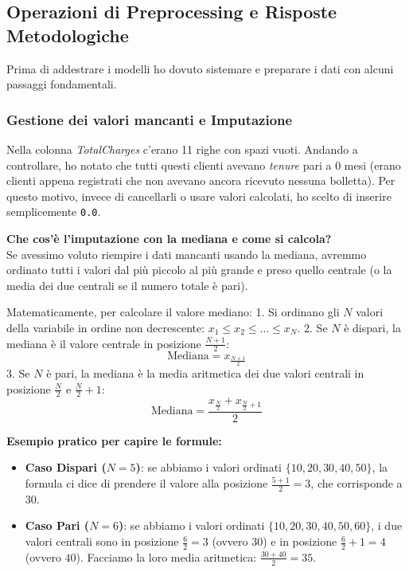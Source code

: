 \documentclass[a4paper,11pt]{article}
\begin{document}
\subsection{Operazioni di Preprocessing e Risposte Metodologiche}
Prima di addestrare i modelli ho dovuto sistemare e preparare i dati con alcuni passaggi fondamentali.

\subsubsection{Gestione dei valori mancanti e Imputazione}
Nella colonna \textit{TotalCharges} c'erano 11 righe con spazi vuoti. Andando a controllare, ho notato che tutti questi clienti avevano \textit{tenure} pari a $0$ mesi (erano clienti appena registrati che non avevano ancora ricevuto nessuna bolletta). Per questo motivo, invece di cancellarli o usare valori calcolati, ho scelto di inserire semplicemente \texttt{0.0}.

\textbf{Che cos'è l'imputazione con la mediana e come si calcola?}\\
Se avessimo voluto riempire i dati mancanti usando la mediana, avremmo ordinato tutti i valori dal più piccolo al più grande e preso quello centrale (o la media dei due centrali se il numero totale è pari).

Matematicamente, per calcolare il valore mediano:
1. Si ordinano gli $N$ valori della variabile in ordine non decrescente: $x_1 \leq x_2 \leq \dots \leq x_N$.
2. Se $N$ è dispari, la mediana è il valore centrale in posizione $\frac{N+1}{2}$:
\begin{equation}
    \text{Mediana} = x_{\frac{N+1}{2}}
\end{equation}
3. Se $N$ è pari, la mediana è la media aritmetica dei due valori centrali in posizione $\frac{N}{2}$ e $\frac{N}{2}+1$:
\begin{equation}
    \text{Mediana} = \frac{x_{\frac{N}{2}} + x_{\frac{N}{2}+1}}{2}
\end{equation}

\textbf{Esempio pratico per capire le formule:}
\begin{itemize}
    \item \textbf{Caso Dispari ($N=5$)}: se abbiamo i valori ordinati $\{10, 20, 30, 40, 50\}$, la formula ci dice di prendere il valore alla posizione $\frac{5+1}{2} = 3$, che corrisponde a $30$.
    \item \textbf{Caso Pari ($N=6$)}: se abbiamo i valori ordinati $\{10, 20, 30, 40, 50, 60\}$, i due valori centrali sono in posizione $\frac{6}{2}=3$ (ovvero $30$) e in posizione $\frac{6}{2}+1=4$ (ovvero $40$). Facciamo la loro media aritmetica: $\frac{30+40}{2} = 35$.
\end{itemize}
\end{document}
